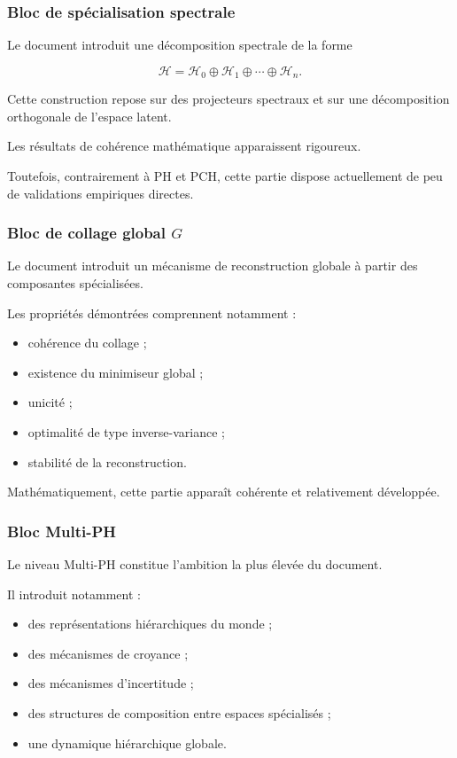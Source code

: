 \subsubsection{Bloc de spécialisation spectrale}

Le document introduit une décomposition spectrale de la forme

\[
\mathcal H
=
\mathcal H_0
\oplus
\mathcal H_1
\oplus
\cdots
\oplus
\mathcal H_n.
\]

Cette construction repose sur des projecteurs spectraux et sur une décomposition orthogonale de l'espace latent.

Les résultats de cohérence mathématique apparaissent rigoureux.

Toutefois, contrairement à PH et PCH, cette partie dispose actuellement de peu de validations empiriques directes.

\subsubsection{Bloc de collage global \(G\)}

Le document introduit un mécanisme de reconstruction globale à partir des composantes spécialisées.

Les propriétés démontrées comprennent notamment :

\begin{itemize}
    \item cohérence du collage ;
    \item existence du minimiseur global ;
    \item unicité ;
    \item optimalité de type inverse-variance ;
    \item stabilité de la reconstruction.
\end{itemize}

Mathématiquement, cette partie apparaît cohérente et relativement développée.

\subsubsection{Bloc Multi-PH}

Le niveau Multi-PH constitue l'ambition la plus élevée du document.

Il introduit notamment :

\begin{itemize}
    \item des représentations hiérarchiques du monde ;
    \item des mécanismes de croyance ;
    \item des mécanismes d'incertitude ;
    \item des structures de composition entre espaces spécialisés ;
    \item une dynamique hiérarchique globale.
\end{itemize}

